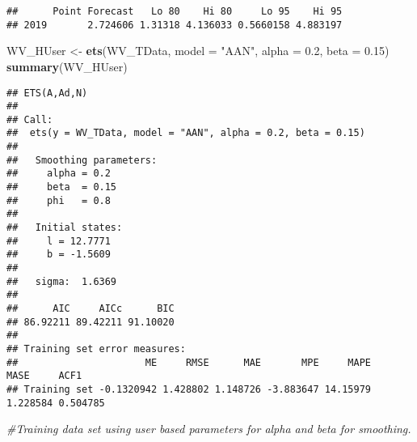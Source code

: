 \documentclass[
]{article}
\newenvironment{Shaded}{\begin{snugshade}}{\end{snugshade}}
\newcommand{\CommentTok}[1]{\textcolor[rgb]{0.56,0.35,0.01}{\textit{#1}}}
\newcommand{\DataTypeTok}[1]{\textcolor[rgb]{0.13,0.29,0.53}{#1}}
\newcommand{\DecValTok}[1]{\textcolor[rgb]{0.00,0.00,0.81}{#1}}
\newcommand{\FloatTok}[1]{\textcolor[rgb]{0.00,0.00,0.81}{#1}}
\newcommand{\KeywordTok}[1]{\textcolor[rgb]{0.13,0.29,0.53}{\textbf{#1}}}
\newcommand{\NormalTok}[1]{#1}
\newcommand{\OperatorTok}[1]{\textcolor[rgb]{0.81,0.36,0.00}{\textbf{#1}}}
\newcommand{\StringTok}[1]{\textcolor[rgb]{0.31,0.60,0.02}{#1}}
\begin{document}
\begin{verbatim}
##      Point Forecast   Lo 80    Hi 80     Lo 95    Hi 95
## 2019       2.724606 1.31318 4.136033 0.5660158 4.883197
\end{verbatim}

\begin{Shaded}
\end{Shaded}

\begin{Shaded}
\begin{Highlighting}[]
\NormalTok{WV_HUser <-}\StringTok{ }\KeywordTok{ets}\NormalTok{(WV_TData, }\DataTypeTok{model =} \StringTok{"AAN"}\NormalTok{, }\DataTypeTok{alpha =} \FloatTok{0.2}\NormalTok{, }\DataTypeTok{beta =} \FloatTok{0.15}\NormalTok{)}
\KeywordTok{summary}\NormalTok{(WV_HUser)}
\end{Highlighting}
\end{Shaded}

\begin{verbatim}
## ETS(A,Ad,N) 
## 
## Call:
##  ets(y = WV_TData, model = "AAN", alpha = 0.2, beta = 0.15) 
## 
##   Smoothing parameters:
##     alpha = 0.2 
##     beta  = 0.15 
##     phi   = 0.8 
## 
##   Initial states:
##     l = 12.7771 
##     b = -1.5609 
## 
##   sigma:  1.6369
## 
##      AIC     AICc      BIC 
## 86.92211 89.42211 91.10020 
## 
## Training set error measures:
##                      ME     RMSE      MAE       MPE     MAPE     MASE     ACF1
## Training set -0.1320942 1.428802 1.148726 -3.883647 14.15979 1.228584 0.504785
\end{verbatim}

\begin{Shaded}
\begin{Highlighting}[]
\CommentTok{#Training data set using user based parameters for alpha and beta for smoothing.}
\end{Highlighting}
\end{Shaded}
\end{document}
